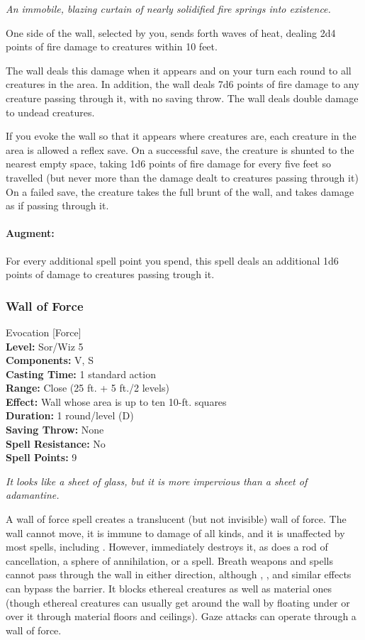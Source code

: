 \emph{An immobile, blazing curtain of nearly solidified fire springs into existence.} 

One side of the wall, selected by you, sends forth waves of heat, 
dealing 2d4 points of fire damage to creatures within 10 feet.

The wall deals this damage when it appears and on your turn each round to all creatures in the area. 
In addition, the wall deals 7d6 points of fire damage to any creature passing through it, with no saving throw.
The wall deals double damage to undead creatures.

If you evoke the wall so that it appears where creatures are, 
each creature in the area is allowed a reflex save.
On a successful save, the creature is shunted to the nearest empty
space, taking 1d6 points of fire damage for every five feet so travelled
(but never more than the damage dealt to creatures passing through it)
On a failed save, the creature takes the full brunt of the wall, and
takes damage as if passing through it.

\paragraph{Augment:} For every additional spell point you spend, this spell deals an additional 1d6 points of damage
to creatures passing trough it.

\subsubsection{Wall of Force}
\label{Spell:WallOfForce}
Evocation [Force]
\\ \textbf{Level:} Sor/Wiz 5
\\ \textbf{Components:} V, S
\\ \textbf{Casting Time:} 1 standard action
\\ \textbf{Range:} Close (25 ft. + 5 ft./2 levels)
\\ \textbf{Effect:} Wall whose area is up to ten 10-ft. squares
\\ \textbf{Duration:} 1 round/level (D)
\\ \textbf{Saving Throw:} None
\\ \textbf{Spell Resistance:} No
\\ \textbf{Spell Points:} 9

\emph{It looks like a sheet of glass, but it is more impervious than a sheet of adamantine.}

A wall of force spell creates a translucent (but not invisible) wall of force. 
The wall cannot move, it is immune to damage of all kinds, and it is unaffected by most spells, including . 
However,  immediately destroys it, as does a rod of cancellation, a sphere of annihilation, or a  spell. 
Breath weapons and spells cannot pass through the wall in either direction, although  , , and similar effects can bypass the barrier. 
It blocks ethereal creatures as well as material ones (though ethereal creatures can usually get around the wall by floating under or over it through material floors and ceilings). 
Gaze attacks can operate through a wall of force.

